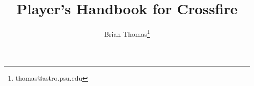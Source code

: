 \documentclass[12pt, a4paper]{report}
\title{Player's Handbook for Crossfire}
\author{Brian Thomas\footnote{thomas@astro.psu.edu}}
\begin{document}
	  
\pagestyle{plain}
\renewcommand{\thepage}{\roman{page}}



\snglsp

\tableofcontents
\listoftables

\pagebreak

\sloppy
\setcounter{page}{1}
\renewcommand{\thepage}{\arabic{page}}









\appendix






% 
\end{document}

